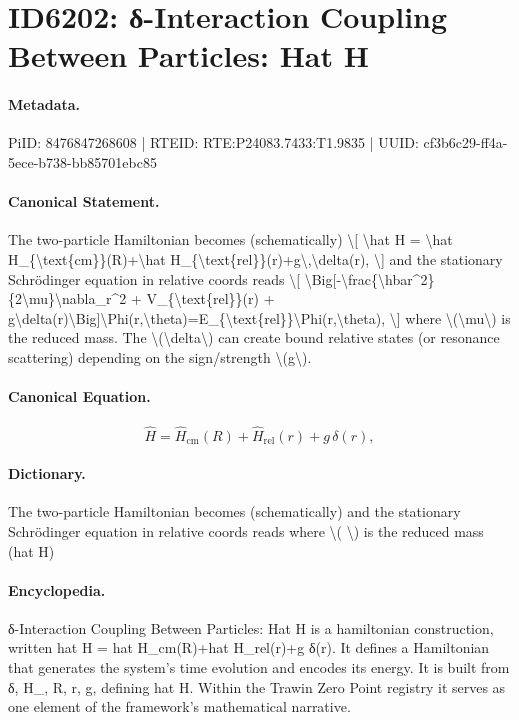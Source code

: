 \section*{ID6202: δ-Interaction Coupling Between Particles: Hat H}
\paragraph{Metadata.}
PiID: 8476847268608 | RTEID: RTE:P24083.7433:T1.9835 | UUID: cf3b6c29-ff4a-5ece-b738-bb85701ebc85

\paragraph{Canonical Statement.}
The two-particle Hamiltonian becomes (schematically) \textbackslash{}[ \textbackslash{}hat H = \textbackslash{}hat H\_\{\textbackslash{}text\{cm\}\}(R)+\textbackslash{}hat H\_\{\textbackslash{}text\{rel\}\}(r)+g\textbackslash{},\textbackslash{}delta(r), \textbackslash{}] and the stationary Schrödinger equation in relative coords reads \textbackslash{}[ \textbackslash{}Big[-\textbackslash{}frac\{\textbackslash{}hbar\textasciicircum{}2\}\{2\textbackslash{}mu\}\textbackslash{}nabla\_r\textasciicircum{}2 + V\_\{\textbackslash{}text\{rel\}\}(r) + g\textbackslash{}delta(r)\textbackslash{}Big]\textbackslash{}Phi(r,\textbackslash{}theta)=E\_\{\textbackslash{}text\{rel\}\}\textbackslash{}Phi(r,\textbackslash{}theta), \textbackslash{}] where \textbackslash{}(\textbackslash{}mu\textbackslash{}) is the reduced mass. The \textbackslash{}(\textbackslash{}delta\textbackslash{}) can create bound relative states (or resonance scattering) depending on the sign/strength \textbackslash{}(g\textbackslash{}).

\paragraph{Canonical Equation.}
\[
\hat H = \hat H_{\text{cm}}(R)+\hat H_{\text{rel}}(r)+g\,\delta(r),
\]

\paragraph{Dictionary.}
The two-particle Hamiltonian becomes (schematically) and the stationary Schrödinger equation in relative coords reads where \textbackslash{}( \textbackslash{}) is the reduced mass (hat H)

\paragraph{Encyclopedia.}
δ-Interaction Coupling Between Particles: Hat H is a hamiltonian construction, written hat H = hat H\_cm(R)+hat H\_rel(r)+g δ(r). It defines a Hamiltonian that generates the system's time evolution and encodes its energy. It is built from δ, H\_, R, r, g, defining hat H. Within the Trawin Zero Point registry it serves as one element of the framework's mathematical narrative.
